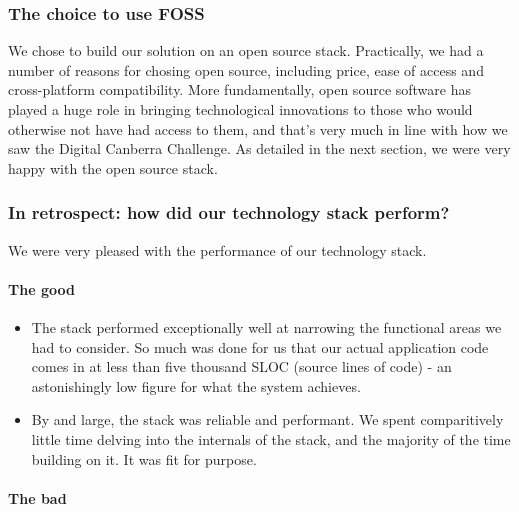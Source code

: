 \documentclass[12pt,a4paper,twosided]{article}
\begin{document}
\subsubsection{The choice to use FOSS}

We chose to build our solution on an open source stack. Practically, we
had a number of reasons for chosing open source, including price, ease
of access and cross-platform compatibility. More fundamentally, open
source software has played a huge role in bringing technological
innovations to those who would otherwise not have had access to them,
and that's very much in line with how we saw the Digital Canberra
Challenge. As detailed in the next section, we were very happy with the
open source stack.

\subsubsection{In retrospect: how did our technology stack perform?}

We were very pleased with the performance of our technology stack.

\paragraph{The good}

\begin{itemize}

\item
  The stack performed exceptionally well at narrowing the functional
  areas we had to consider. So much was done for us that our actual
  application code comes in at less than five thousand SLOC (source
  lines of code) - an astonishingly low figure for what the system
  achieves.
\item
  By and large, the stack was reliable and performant. We spent
  comparitively little time delving into the internals of the stack, and
  the majority of the time building on it. It was fit for purpose.
\end{itemize}

\paragraph{The bad}
\end{document}
